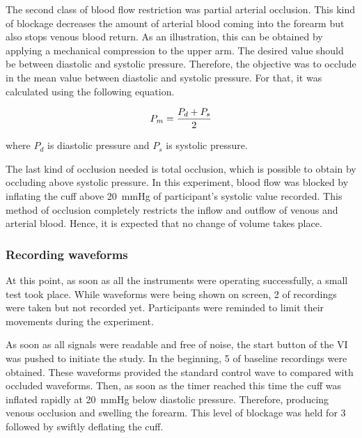 The second class of blood flow restriction was partial arterial occlusion. This kind of blockage decreases the amount of arterial blood coming into the forearm but also stops venous blood return. As an illustration, this can be obtained by applying a mechanical compression to the upper arm. The desired value should be between diastolic and systolic pressure. Therefore, the objective was to occlude in the mean value between diastolic and systolic pressure. For that, it was calculated using the following equation.


\begin{align}
	\label{eq:meanpressure}
	P_m = \frac{P_d + P_s}{2} \tagaddtext{[\si{\mmHg}]}
\end{align}

where $P_d$ is diastolic pressure and $P_s$ is systolic pressure. 

The last kind of occlusion needed is total occlusion, which is possible to obtain by occluding above systolic pressure. In this experiment, blood flow was blocked by inflating the cuff above \SI{20}{\mmHg} of participant's systolic value recorded. This method of occlusion completely restricts the inflow and outflow of venous and arterial blood. Hence, it is expected that no change of volume takes place.

\subsubsection{Recording waveforms}

At this point, as soon as all the instruments were operating successfully, a small test took place. While waveforms were being shown on screen, \SI{2}{\min} of recordings were taken but not recorded yet. Participants were reminded to limit their movements during the experiment. 

As soon as all signals were readable and free of noise, the start button of the VI was pushed to initiate the study. In the beginning, \SI{5}{\min} of baseline recordings were obtained. These waveforms provided the standard control wave to compared with occluded waveforms. Then, as soon as the timer reached this time the cuff was inflated rapidly at \SI{20}{\mmHg} below diastolic pressure. Therefore, producing venous occlusion and swelling the forearm. This level of blockage was held for \SI{3}{\min} followed by swiftly deflating the cuff. 

